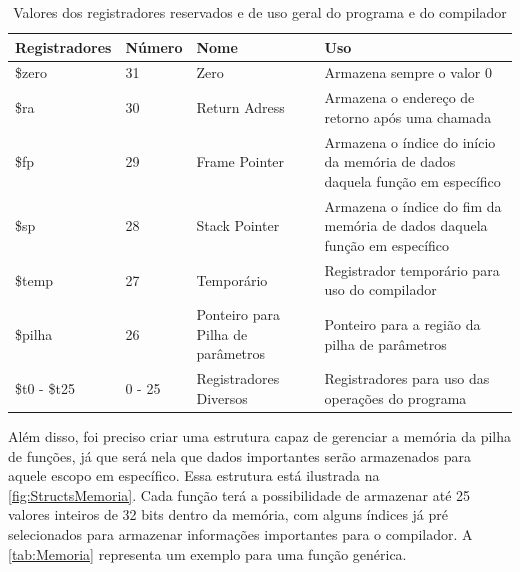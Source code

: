 \documentclass[
	12pt,				%
	oneside,
	a4paper,			%
	english,			%
	french,				%
	spanish,			%
	brazil,				%
	]{abntex2}
\begin{document}
\begin{table}[htbp]
\centering
\ABNTEXfontereduzida
\caption{Valores dos registradores reservados e de uso geral do programa e do compilador} 
\label{tab:Registradores}
\begin{tabular}{||m{3cm}||m{2cm}||m{3.5cm}||m{5cm}||} 
\hline
\multicolumn{1}{||m{3cm}||}{\centering Registradores} & \multicolumn{1}{m{2cm}||}{\centering Número} & \multicolumn{1}{m{3.5cm}||}{\centering Nome} & \multicolumn{1}{m{5cm}||}{\centering Uso}\\ [0.5ex] 
 \hline \hline
\$zero  & 31 & Zero & Armazena sempre o valor 0 \\ \hline
\$ra   &  30 & Return Adress  & Armazena o endereço de retorno após uma chamada \\ \hline 
\$fp   & 29 & Frame Pointer & Armazena o índice do início da memória de dados daquela função em específico  \\ \hline 
\$sp   & 28 & Stack Pointer &  Armazena o índice do fim da memória de dados daquela função em específico     \\ \hline 
\$temp & 27 & Temporário & Registrador temporário para uso do compilador \\ \hline 
\$pilha  & 26 & Ponteiro para Pilha de parâmetros & Ponteiro para a região da pilha de parâmetros \\ \hline      
\$t0 - \$t25 & 0 - 25 & Registradores Diversos & Registradores para uso das operações do programa \\ \hline 
\end{tabular}
\end{table}

Além disso, foi preciso criar uma estrutura capaz de gerenciar a memória da pilha de funções, já que será nela que dados importantes serão armazenados para aquele escopo em específico. Essa estrutura está ilustrada na \autoref{fig:StructsMemoria}. Cada função terá a possibilidade de armazenar até 25 valores inteiros de 32 bits dentro da memória, com alguns índices já pré selecionados para armazenar informações importantes para o compilador. A \autoref{tab:Memoria} representa um exemplo para uma função genérica.
\end{document}
